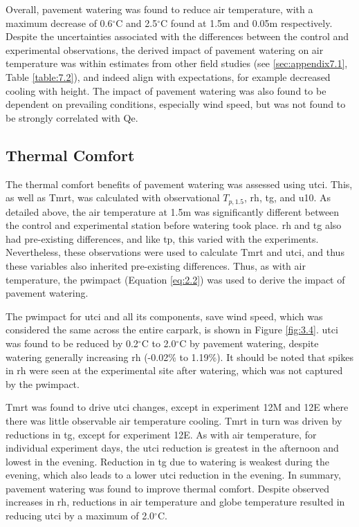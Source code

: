 \documentclass[final,3p,times,authoryear]{elsarticle}
\begin{document}
Overall, pavement watering was found to reduce air temperature, with a maximum
decrease of 0.6$^{\circ}$C and 2.5$^{\circ}$C found at 1.5m and 0.05m respectively. Despite the uncertainties associated with the differences between the control and experimental observations, the derived impact of pavement watering on air temperature was within estimates from other field studies (see \ref{sec:appendix7.1}, Table \ref{table:7.2}), and indeed align with expectations, for example decreased cooling with height. The impact of pavement watering was also found to be dependent on prevailing conditions, especially wind speed, but was not found to be strongly correlated with \gls{Qe}.

\subsection{Thermal Comfort}\label{sec:discussion3.2}

The thermal comfort benefits of pavement watering was assessed using \gls{utci}. This, as
well as \gls{Tmrt}, was calculated with observational $T_{p,1.5}$, \gls{rh}, \gls{tg}, and \gls{u10}. As detailed above, the air temperature at 1.5m was significantly different between the control and experimental station before watering took place. \gls{rh} and \gls{tg} also had pre-existing differences, and like \gls{tp}, this varied with the experiments. Nevertheless, these observations were used to calculate \gls{Tmrt} and \gls{utci}, and thus these variables also inherited pre-existing differences. Thus, as with air temperature, the \gls{pwimpact} (Equation \ref{eq:2.2}) was used to derive the impact of pavement watering.

The \gls{pwimpact} for \gls{utci} and all its components, save wind speed, which was considered the same across the entire carpark, is shown in Figure \ref{fig:3.4}. \gls{utci} was found to be reduced by 0.2$^{\circ}$C to 2.0$^{\circ}$C by pavement watering, despite watering generally increasing \gls{rh} (-0.02\% to 1.19\%). It should be noted that spikes in \gls{rh} were seen at the experimental site after watering, which was not captured by the \gls{pwimpact}. 

\gls{Tmrt} was found to drive \gls{utci} changes, except in experiment 12M and 12E where there was little observable air temperature cooling. \gls{Tmrt} in turn was driven by reductions in \gls{tg}, except for experiment 12E. As with air temperature, for individual experiment days, the \gls{utci} reduction is greatest in the afternoon and lowest in the evening. Reduction in \gls{tg} due to watering is weakest during the evening, which also leads to a lower \gls{utci} reduction in the evening. In summary, pavement watering was found to improve thermal comfort. Despite observed increases in \gls{rh}, reductions in air temperature and globe temperature resulted in reducing \gls{utci} by a maximum of 2.0$^{\circ}$C.
\end{document}
